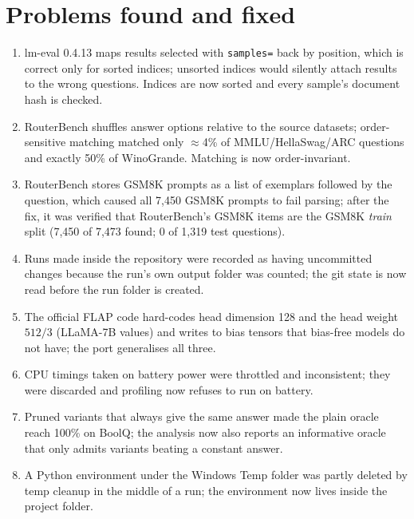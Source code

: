 \documentclass[11pt,a4paper]{article}
\begin{document}
\appendix
\section{Problems found and fixed}
\label{app:issues}
\begin{enumerate}
  \item lm-eval 0.4.13 maps results selected with \texttt{samples=} back by position, which is correct only
  for sorted indices; unsorted indices would silently attach results to the wrong questions. Indices are
  now sorted and every sample's document hash is checked.
  \item RouterBench shuffles answer options relative to the source datasets; order-sensitive matching
  matched only $\approx$4\% of MMLU/HellaSwag/ARC questions and exactly 50\% of WinoGrande. Matching is now
  order-invariant.
  \item RouterBench stores GSM8K prompts as a list of exemplars followed by the question, which caused all
  7{,}450 GSM8K prompts to fail parsing; after the fix, it was verified that RouterBench's GSM8K items are
  the GSM8K \emph{train} split (7{,}450 of 7{,}473 found; 0 of 1{,}319 test questions).
  \item Runs made inside the repository were recorded as having uncommitted changes because the run's own
  output folder was counted; the git state is now read before the run folder is created.
  \item The official FLAP code hard-codes head dimension 128 and the head weight $512/3$ (LLaMA-7B values) and
  writes to bias tensors that bias-free models do not have; the port generalises all three.
  \item CPU timings taken on battery power were throttled and inconsistent; they were discarded and profiling now
  refuses to run on battery.
  \item Pruned variants that always give the same answer made the plain oracle reach 100\% on BoolQ; the analysis
  now also reports an informative oracle that only admits variants beating a constant answer.
  \item A Python environment under the Windows Temp folder was partly deleted by temp cleanup in the middle of a run;
  the environment now lives inside the project folder.
\end{enumerate}



\end{document}
